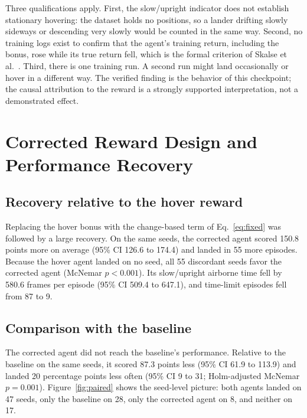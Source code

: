 \documentclass[11pt,a4paper]{article}
\begin{document}
Three qualifications apply. First, the slow/upright indicator does not establish stationary hovering: the dataset holds no positions, so a lander drifting slowly sideways or descending very slowly would be counted in the same way. Second, no training logs exist to confirm that the agent's training return, including the bonus, rose while its true return fell, which is the formal criterion of Skalse et al.\ \cite{skalse2022}. Third, there is one training run. A second run might land occasionally or hover in a different way. The verified finding is the behavior of this checkpoint; the causal attribution to the reward is a strongly supported interpretation, not a demonstrated effect.

\section{Corrected Reward Design and Performance Recovery}\label{sec:correction}

\subsection{Recovery relative to the hover reward}

Replacing the hover bonus with the change-based term of Eq.~\eqref{eq:fixed} was followed by a large recovery. On the same seeds, the corrected agent scored 150.8 points more on average (95\% CI 126.6 to 174.4) and landed in 55 more episodes. Because the hover agent landed on no seed, all 55 discordant seeds favor the corrected agent (McNemar $p<0.001$). Its slow/upright airborne time fell by 580.6 frames per episode (95\% CI 509.4 to 647.1), and time-limit episodes fell from 87 to 9.

\subsection{Comparison with the baseline}

The corrected agent did not reach the baseline's performance. Relative to the baseline on the same seeds, it scored 87.3 points less (95\% CI 61.9 to 113.9) and landed 20 percentage points less often (95\% CI 9 to 31; Holm-adjusted McNemar $p=0.001$). Figure~\ref{fig:paired} shows the seed-level picture: both agents landed on 47 seeds, only the baseline on 28, only the corrected agent on 8, and neither on 17.
\end{document}
